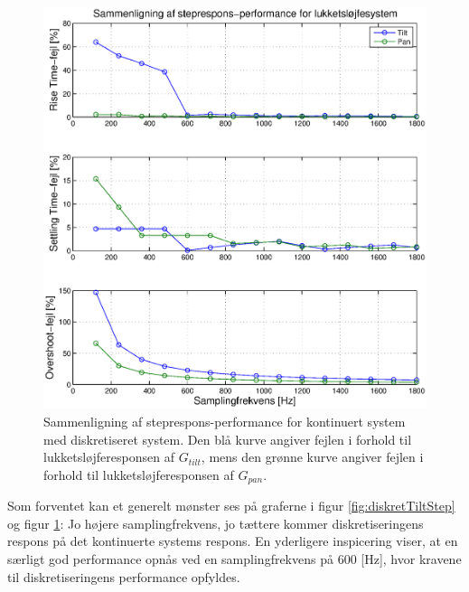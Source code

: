 \begin{figure}[!th]
\centering
	\includegraphics[width=1\textwidth]{./graphics/diskretStepFreq.eps}

\caption[Sammenligning af steprespons-performance for kontinuert system med diskretiseret system $G_{zoh}$]
{Sammenligning af steprespons-performance for kontinuert system med diskretiseret system.
Den blå kurve angiver fejlen i forhold til lukketsløjferesponsen af $G_{tilt}$,
mens den grønne kurve angiver fejlen i forhold til lukketsløjferesponsen af $G_{pan}$.
}
\label{fig:diskretStepFreq}
\end{figure}

Som forventet kan et generelt mønster ses på graferne i figur \ref{fig:diskretTiltStep} og figur \ref{fig:diskretStepFreq}:
Jo højere samplingfrekvens, jo tættere kommer diskretiseringens respons på det kontinuerte systems respons.
En yderligere inspicering viser, at en særligt god performance opnås ved en samplingfrekvens på 600 [Hz],
hvor kravene til diskretiseringens performance opfyldes.

